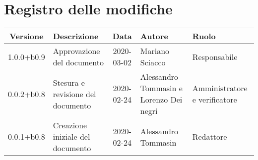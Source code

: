 \section*{Registro delle modifiche}

\begin{center}
	\begin{longtable}{|c|p{3.5cm}|c|p{3cm}|p{3cm}|}
	\hline
	\rowcolor{lighter-grayer}
	\textbf{Versione} & \textbf{Descrizione} & \textbf{Data} & \textbf{Autore} & \textbf{Ruolo} \\
	\hline
	\endfirsthead


	1.0.0+b0.9 & Approvazione del documento & 2020-03-02 & Mariano Sciacco & Responsabile \\
	\hline
	0.0.2+b0.8 & Stesura e revisione del documento & 2020-02-24 & Alessandro Tommasin e Lorenzo Dei negri & Amministratore e verificatore \\
	\hline
	0.0.1+b0.8 & Creazione iniziale del documento & 2020-02-24 & Alessandro Tommasin & Redattore \\
	\hline

	\end{longtable}
\end{center}